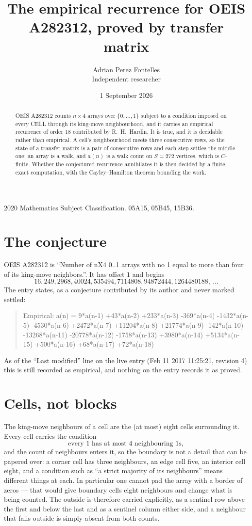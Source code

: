 \documentclass[11pt,a4paper]{article}
\title{The empirical recurrence for OEIS A282312, proved by transfer matrix}
\author{Adrian Perez Fontelles\\ \small Independent researcher}
\date{1 September 2026}
\theoremstyle{plain}
\theoremstyle{definition}
\begin{document}
\maketitle

\begin{abstract}
OEIS A282312 counts $n\times4$ arrays over $\{0,\dots,1\}$ subject to a condition imposed on
every CELL through its king-move neighbourhood, and it carries an empirical recurrence of
order $18$ contributed by R.~H.~Hardin. It is true, and it is decidable rather than
empirical. A cell's neighbourhood meets three consecutive rows, so the state of a transfer
matrix is a pair of consecutive rows and each step settles the middle one; an array is a
walk, and $a(n)$ is a walk count on $S=272$ vertices, which is $C$-finite. Whether the
conjectured recurrence annihilates it is then decided by a finite exact computation, with the
Cayley--Hamilton theorem bounding the work.
\end{abstract}

\noindent\small 2020 Mathematics Subject Classification. 05A15, 05B45, 15B36.\normalsize

\section{The conjecture}

OEIS A282312 is ``Number of nX4 0..1 arrays with no 1 equal to more than four of its king-move neighbors.''. It has offset $1$ and begins
\[
16, 249, 2968, 40024, 535494, 7114808, 94872444, 1264480188,\ \dots
\]
The entry states, as a conjecture contributed by its author and never marked settled:
\begin{quote}
Empirical: a(n) = 9*a(n-1) +43*a(n-2) +233*a(n-3) -369*a(n-4) -1432*a(n-5) -4530*a(n-6) +2472*a(n-7) +11204*a(n-8) +21774*a(n-9) -142*a(n-10) -13268*a(n-11) -20778*a(n-12) -1758*a(n-13) +3980*a(n-14) +5134*a(n-15) +500*a(n-16) +68*a(n-17) +72*a(n-18)
\end{quote}
As of the ``Last modified'' line on the live entry (Feb 11 2017 11:25:21, revision 4) this is still
recorded as empirical, and nothing on the entry records it as proved.

\section{Cells, not blocks}

The king-move neighbours of a cell are the (at most) eight cells surrounding it. Every cell
carries the condition
\[
\text{every }1\text{ has at most }4\text{ neighbouring }1\text{s},
\]
and the count of neighbours enters it, so the boundary is not a detail that can be papered
over: a corner cell has three neighbours, an edge cell five, an interior cell eight, and a
condition such as ``a strict majority of its neighbours'' means different things at each. In
particular one cannot pad the array with a border of zeros --- that would give boundary cells
eight neighbours and change what is being counted. The outside is therefore carried
explicitly, as a sentinel row above the first and below the last and as a sentinel column
either side, and a neighbour that falls outside is simply absent from both counts.
\end{document}
